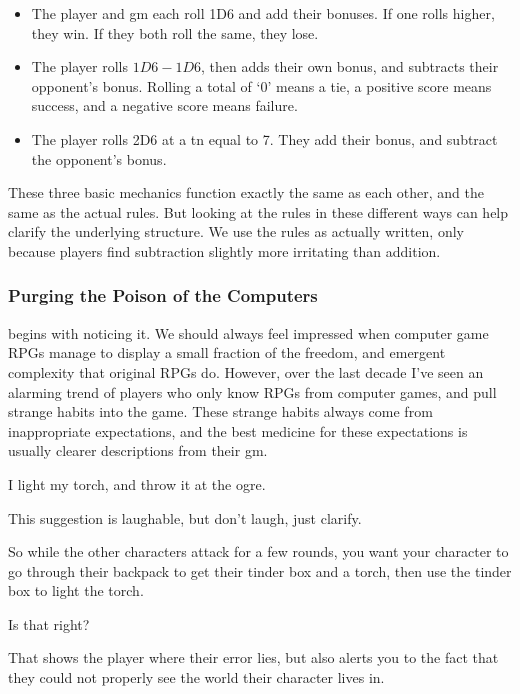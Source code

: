 \begin{multicols}{2}
\begin{itemize}
  \item
  The player and \gls{gm} each roll 1D6 and add their bonuses.
  If one rolls higher, they win.
  If they both roll the same, they lose.
  \item
  The player rolls $1D6-1D6$, then adds their own bonus, and subtracts their opponent's bonus.
  Rolling a total of `0' means a tie, a positive score means success, and a negative score means failure.
  \item
  The player rolls 2D6 at a \gls{tn} equal to 7.
  They add their bonus, and subtract the opponent's bonus.
\end{itemize}

These three basic mechanics function exactly the same as each other, and the same as the actual rules.
But looking at the rules in these different ways can help clarify the underlying structure.
We use the rules as actually written, only because players find subtraction slightly more irritating than addition.

\subsubsection{Purging the Poison of the Computers}
begins with noticing it.
We should always feel impressed when computer game RPGs manage to display a small fraction of the freedom, and emergent complexity that original RPGs do.
However, over the last decade I've seen an alarming trend of players who only know RPGs from computer games, and pull strange habits into the game.
These strange habits always come from inappropriate expectations, and the best medicine for these expectations is usually clearer descriptions from their \gls{gm}.

\begin{boxtext}
  I light my torch, and throw it at the ogre.
\end{boxtext}

This suggestion is laughable, but don't laugh, just clarify.

\begin{speechtext}
  So while the other characters attack for a few rounds, you want your character to go through their backpack to get their tinder box and a torch, then use the tinder box to light the torch.

  Is that right?
\end{speechtext}

That shows the player where their error lies, but also alerts you to the fact that they could not properly see the world their character lives in.


\end{multicols}

